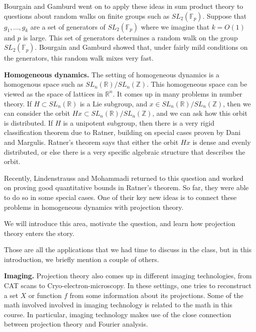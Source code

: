 \documentclass[12pt]{amsart}
\newcommand{\FF}{\mathbb{F}}
\newcommand{\ZZ}{\mathbb{Z}}
\newcommand{\RR}{\mathbb{R}}
\begin{document}
Bourgain and Gamburd went on to apply these ideas in sum product theory to questions about random walks on finite groups such as $SL_2(\FF_p)$.   Suppose that $g_1,  ..., g_k$ are a set of generators of $SL_2(\FF_p)$ where we imagine that $k = O(1)$ and $p$ is large.   This set of generators determines a random walk on the group $SL_2(\FF_p)$.   Bourgain and Gamburd showed that, under fairly mild conditions on the generators,  this random walk mixes very fast.   

\vskip10pt

{\bf Homogeneous dynamics.} The setting of homogeneous dynamics is a homogenous space such as $SL_n(\RR) / SL_n(\ZZ)$.   This homogeneous space can be viewed as the space of lattices in $\RR^n$.   It comes up in many problems in number theory.  If $H \subset SL_n(\RR)$ is a Lie subgroup,  and $x \in SL_n(\RR) / SL_n(\ZZ)$,  then we can consider the orbit $Hx \subset SL_n(\RR) / SL_n(\ZZ)$,  and we can ask how this orbit is distributed.   If $H$ is a unipotent subgroup,  then there is a very rigid classification theorem due to Ratner,  building on special cases proven by Dani and Margulis.  Ratner's theorem says that either the orbit $Hx$ is dense and evenly distributed,  or else there is a very specific algebraic structure that describes the orbit.   

Recently,  Lindenstrauss and Mohammadi returned to this question and worked on proving good quantitative bounds in Ratner's theorem.   So far,  they were able to do so in some special cases.   One of their key new ideas is to connect these problems in homogeneous dynamics with projection theory.   

We will introduce this area,  motivate the question,  and learn how projection theory enters the story.

\vskip10pt

Those are all the applications that we had time to discuss in the class,  but in this introduction,  we briefly mention a couple of others.

\vskip10pt

{\bf Imaging.} Projection theory also comes up in different imaging technologies,  from CAT scans to Cryo-electron-microscopy.   In these settings,  one tries to reconstruct a set $X$ or function $f$ from some information about its projections.   Some of the math involved involved in imaging technology is related to the math in this course.  In particular,  imaging technology makes use of the close connection between projection theory and Fourier analysis. 
\end{document}
